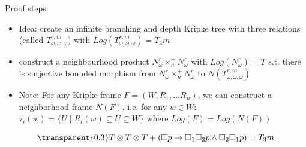 \begin{frame}{Proof steps}
	\begin{itemize}
		\setlength{\itemsep}{1em}
	    \item Idea: create an infinite branching and depth Kripke tree with three relations (called $T_{\omega,\omega,\omega}^{r,m}$) with $Log(T_{\omega,\omega,\omega}^{r,m}) = T_3m$ 
	    \item construct a neighbourhood product $N_{\omega}^r \times_n^+ N_{\omega}^r$ 
		with $Log(N_\omega^r) = T$ s.t. there is surjective bounded morphism from $N_{\omega}^r \times_n^+ N_{\omega}^r$ to $N(T_{\omega,\omega,\omega}^{r,m})$
        \item Note: For any Kripke frame $F = (W, R_1,...R_n)$, we can construct a neighborhood frame $N(F)$, i.e.
       for any $w \in W$: $\tau_i(w) = \{U \mid R_i(w) \subseteq U \subseteq W\}$ where $Log(F) = Log(N(F))$ 

		\end{itemize}

		\[ 
	{\transparent{0.3} T \otimes T \otimes T + (\Box p \to \Box_1\Box_2 p \land \Box_2\Box_1 p) = T_3m }
 \]
\end{frame}












